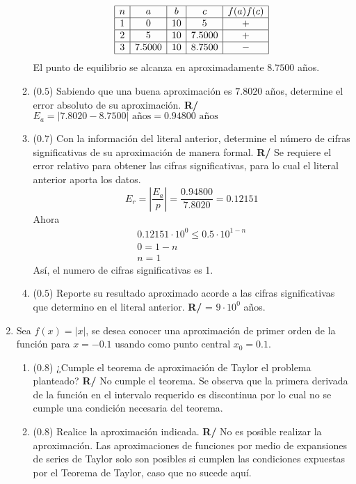 \documentclass[12pt]{article}
\begin{document}
\begin{enumerate}[leftmargin=*,widest=9]
\begin{enumerate}[label=\alph*]
\[
\begin{array}{|c|c|c|c|c|}
  \hline
  n & a & b & c & f(a)f(c)\\
  \hline
  1 & 0 & 10 & 5 & + \\
  \hline
  2 & 5 & 10 & 7.5000 & + \\
  \hline
  3 & 7.5000 & 10 & 8.7500 & - \\
  \hline
 \end{array}
\]
El punto de equilibrio se alcanza en aproximadamente \(8.7500\) años.
    \item (\(0.5\)) Sabiendo que una buena aproximación es \(7.8020\) años, determine el error absoluto de su aproximación.
\textbf{R/} \(E_a = |7.8020 - 8.7500| \text{ años} = 0.94800 \text{ años}\)
    \item (\(0.7\)) Con la información del literal anterior, determine el número de cifras significativas de su aproximación de manera formal.
\textbf{R/} Se requiere el error relativo para obtener las cifras significativas, para lo cual el literal anterior aporta los datos.
\[E_r = \left| \frac{E_a}{p}\right| = \frac{0.94800}{7.8020} = 0.12151\]
Ahora
\begin{eqnarray*}
0.12151 \cdot 10^0 \leq 0.5 \cdot 10^{1-n} \\ 0 = 1-n \\ n = 1
\end{eqnarray*}
Así, el numero de cifras significativas es 1.
\item (\(0.5\)) Reporte su resultado aproximado acorde a las cifras significativas que determino en el literal anterior.
\textbf{R/} = \(9 \cdot 10^0\) años.
\end{enumerate}
   \item Sea \(f(x) = \left\vert x \right\vert\), se desea conocer una aproximación de primer orden de la función para \(x=-0.1\) usando como punto central \(x_0=0.1\).
   \begin{enumerate}[label=\alph*]
    \item (\(0.8\)) ¿Cumple el teorema de aproximación de Taylor el problema planteado?
    \textbf{R/} No cumple el teorema. Se observa que la primera derivada de la función en el intervalo requerido es discontinua por lo cual no se cumple una condición necesaria del teorema.
\item (\(0.8\)) Realice la aproximación indicada.
\textbf{R/} No es posible realizar la aproximación. Las aproximaciones de funciones por medio de expansiones de series de Taylor solo son posibles si cumplen las condiciones expuestas por el Teorema de Taylor, caso que no sucede aquí.
  \end{enumerate}
\end{enumerate}
\end{document}
